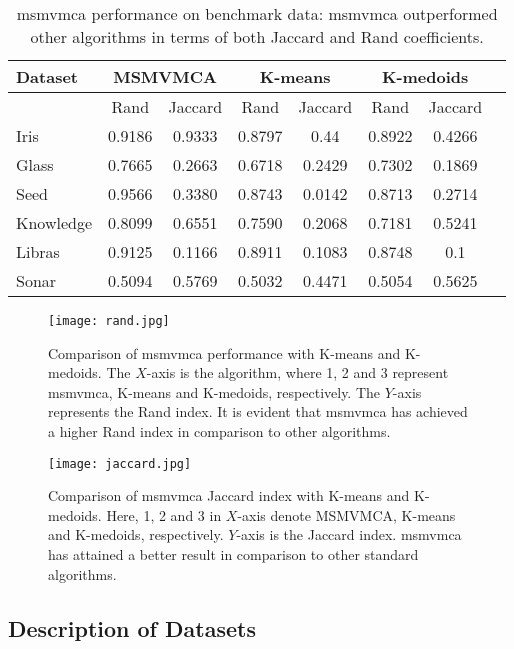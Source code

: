 \documentclass[fleqn,usenatbib]{mnras}
\begin{document}
\begin{table*}
\caption{\acrshort{msmvmca} performance on benchmark data: \acrshort{msmvmca} outperformed other algorithms in terms of both Jaccard and Rand coefficients.}
\label{table:msmvmca} 
\begin{tabular}{|l|c|c|c|c|c|c|c|}
\hline
   Dataset&\multicolumn{2}{c|}{MSMVMCA}& \multicolumn{2}{c|}{K-means}&\multicolumn{2}{c|}{K-medoids} \\
   \hline
   &Rand& Jaccard&Rand&Jaccard&Rand&Jaccard\\
 \hline
 Iris&0.9186& 0.9333& 0.8797& 0.44& 0.8922& 0.4266\\
 \hline
 Glass&0.7665&0.2663& 0.6718& 0.2429& 0.7302& 0.1869 \\
 \hline
    Seed&0.9566 &0.3380&0.8743& 0.0142& 0.8713& 0.2714 \\
\hline
    Knowledge &0.8099& 0.6551&0.7590& 0.2068& 0.7181& 0.5241 \\
\hline
 Libras& 0.9125&0.1166&0.8911& 0.1083& 0.8748& 0.1 \\
\hline
 Sonar&0.5094 &0.5769&0.5032& 0.4471& 0.5054& 0.5625 \\
\hline
\end{tabular}
\end{table*}

\begin{figure*}
\centering
\texttt{[image: rand.jpg]}
\caption{Comparison of \acrshort{msmvmca} performance with K-means and K-medoids. The $X$-axis is the algorithm, where 1, 2 and 3 represent \acrshort{msmvmca}, K-means and K-medoids, respectively. The  $Y$-axis represents the Rand index. It is evident that \acrshort{msmvmca} has achieved a higher Rand index in comparison to other algorithms.}
\label{rand}
\end{figure*}

\begin{figure*}
\texttt{[image: jaccard.jpg]}
\caption{Comparison of \acrshort{msmvmca} Jaccard index with K-means and K-medoids. Here, 1, 2 and 3 in $X$-axis denote MSMVMCA, K-means and K-medoids, respectively. $Y$-axis is the Jaccard index. \acrshort{msmvmca} has attained a better result in comparison to other standard algorithms.}
\label{jaccard}
\centering
\end{figure*}
 

\subsection{Description of Datasets}
\end{document}

